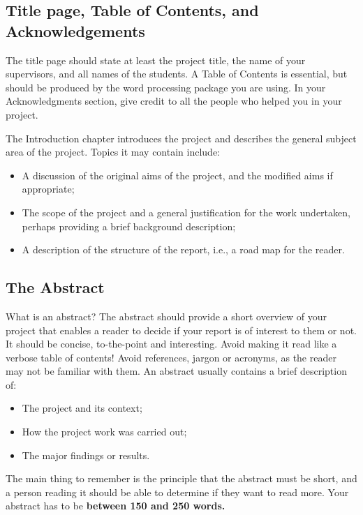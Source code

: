 \documentclass[]{final_report}
\begin{document}
\subsection{Title page, Table of Contents, and Acknowledgements}

The title page should state at least the project title, the name of your supervisors, and all names of the students. A Table of Contents is essential, but should be produced by the word processing package you are using. In your Acknowledgments section, give credit to all the people who helped you in your project.


The Introduction chapter introduces the project and describes the general subject area of the project. Topics it may contain include:

\begin{itemize}
\item A discussion of the original aims of the project, and the modified aims if appropriate;
\item The scope of the project and a general justification for the work undertaken, perhaps providing a brief background description;
\item A description of the structure of the report, i.e., a road map for the reader.
\end{itemize}


\subsection{The Abstract}

What is an abstract? The abstract should provide a short overview of your project that enables a reader to decide if your report is of interest to them or not. It should be concise, to-the-point and interesting. Avoid making it read like a verbose table of contents! Avoid references, jargon or acronyms, as the reader may not be familiar with them. An abstract usually contains a brief description of:

\begin{itemize}
\item The project and its context;
\item How the project work was carried out;
\item The major findings or results.
\end{itemize}

The main thing to remember is the principle that the abstract must be short, and a person reading it should be able to determine if they want to read more. Your abstract has to be \textbf{between 150 and 250 words.}
\end{document}
